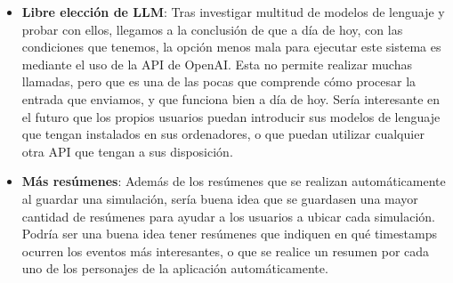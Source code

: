 \begin{itemize}
	\item \textbf{Libre elección de LLM}: Tras investigar multitud de modelos de lenguaje y probar con ellos, llegamos a la conclusión de que a día de hoy, con las condiciones que tenemos, la opción menos mala para ejecutar este sistema es mediante el uso de la API de OpenAI. Esta no permite realizar muchas llamadas, pero que es una de las pocas que comprende cómo procesar la entrada que enviamos, y que funciona bien a día de hoy. Sería interesante en el futuro que los propios usuarios puedan introducir sus modelos de lenguaje que tengan instalados en sus ordenadores, o que puedan utilizar cualquier otra API que tengan a sus disposición.
	
	\item \textbf{Más resúmenes}: Además de los resúmenes que se realizan automáticamente al guardar una simulación, sería buena idea que se guardasen una mayor cantidad de resúmenes para ayudar a los usuarios a ubicar cada simulación. Podría ser una buena idea tener resúmenes que indiquen en qué timestamps ocurren los eventos más interesantes, o que se realice un resumen por cada uno de los personajes de la aplicación automáticamente.
	
\end{itemize}

